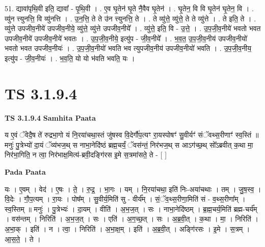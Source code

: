 \documentclass[17pt]{extarticle}
\begin{document}
51. द्यावा॑पृथि॒वी इति॒ द्यावा᳚ - पृ॒थि॒वी । . ए॒व घृ॒तेन॑ घृ॒ते नै॒वैव घृ॒तेन॑ । . घृ॒तेन॒ वि वि घृ॒तेन॑ घृ॒तेन॒ वि । . व्यु॑न त्त्युनत्ति॒ वि व्यु॑नत्ति । . उ॒न॒त्ति॒ ते ते उ॑न त्त्युनत्ति॒ ते । . ते व्यु॑त्ते॒ व्यु॑त्ते॒ ते ते व्यु॑त्ते । . ते इति॒ ते । . व्यु॑त्ते उपजीव॒नीये॑ उपजीव॒नीये॒ व्यु॑त्ते॒ व्यु॑त्ते उपजीव॒नीये᳚ । . व्यु॑त्ते॒ इति॒ वि - उ॒त्ते॒ । . उ॒प॒जी॒व॒नीये॑ भवतो भवत उपजीव॒नीये॑ उपजीव॒नीये॑ भवतः । . उ॒प॒जी॒व॒नीये॒ इत्यु॑प - जी॒व॒नीये᳚ । . भ॒व॒त॒ उ॒प॒जी॒व॒नीय॑ उपजीव॒नीयो॑ भवतो भवत उपजीव॒नीयः॑ । . उ॒प॒जी॒व॒नीयो॑ भवति भव त्युपजीव॒नीय॑ उपजीव॒नीयो॑ भवति । . उ॒प॒जी॒व॒नीय॒ इत्यु॑प - जी॒व॒नीयः॑ । . भ॒व॒ति॒ यो यो भ॑वति भवति॒ यः । \newline
\pagebreak
{}

\section{ TS 3.1.9.4 }

\textbf{TS 3.1.9.4 } \newline
\textbf{Samhita Paata} \newline

य ए॒वं ॅवेदै॒ष ते॑ रुद्रभा॒गो यं नि॒रया॑चथा॒स्तं जु॑षस्व वि॒देर्गौ॑प॒त्यꣳ रा॒यस्पोषꣳ॑ सु॒वीर्यꣳ॑ संॅवथ्स॒रीणाꣳ॑ स्व॒स्तिं ॥ मनुः॑ पु॒त्रेभ्यो॑ दा॒यं ॅव्य॑भज॒थ् स नाभा॒नेदि॑ष्ठं ब्रह्म॒चर्यं॒ ॅवस॑न्तं॒ निर॑भज॒थ् स आऽग॑च्छ॒थ् सो᳚ऽब्रवीत् क॒था मा॒ निर॑भा॒गिति॒ न त्वा॒ निर॑भाक्ष॒मित्य॑-ब्रवी॒दङ्गि॑रस इ॒मे स॒त्रमा॑सते॒ ते - [  ] \newline

\textbf{Pada Paata} \newline

यः । ए॒वम् । वेद॑ । ए॒षः । ते॒ । रु॒द्र॒ । भा॒गः । यम् । नि॒रया॑चथा॒ इति॑ निः-अया॑चथाः । तम् । जु॒ष॒स्व॒ । वि॒देः । गौ॒प॒त्यम् । रा॒यः । पोष᳚म् । सु॒वीर्य॒मिति॑ सु - वीर्य᳚म् । सं॒ॅव॒थ्स॒रीणा॒मिति॑ सं - व॒थ्स॒रीणा᳚म् । स्व॒स्तिम् ॥ मनुः॑ । पु॒त्रेभ्यः॑ । दा॒यम् । वीति॑ । अ॒भ॒ज॒त् । सः । नाभा॒नेदि॑ष्ठम् । ब्र॒ह्म॒चर्य॒मिति॑ ब्रह्म-चर्य᳚म् । वस॑न्तम् । निरिति॑ । अ॒भ॒ज॒त् । सः । एति॑ । अ॒ग॒च्छ॒त् । सः । अ॒ब्र॒वी॒त् । क॒था । मा॒ । निरिति॑ । अ॒भा॒क् । इति॑ । न । त्वा॒ । निरिति॑ । अ॒भा॒क्ष॒म् । इति॑ । अ॒ब्र॒वी॒त् । अङ्गि॑रसः । इ॒मे । स॒त्रम् । आ॒स॒ते॒ । ते ।  \newline
\end{document}
